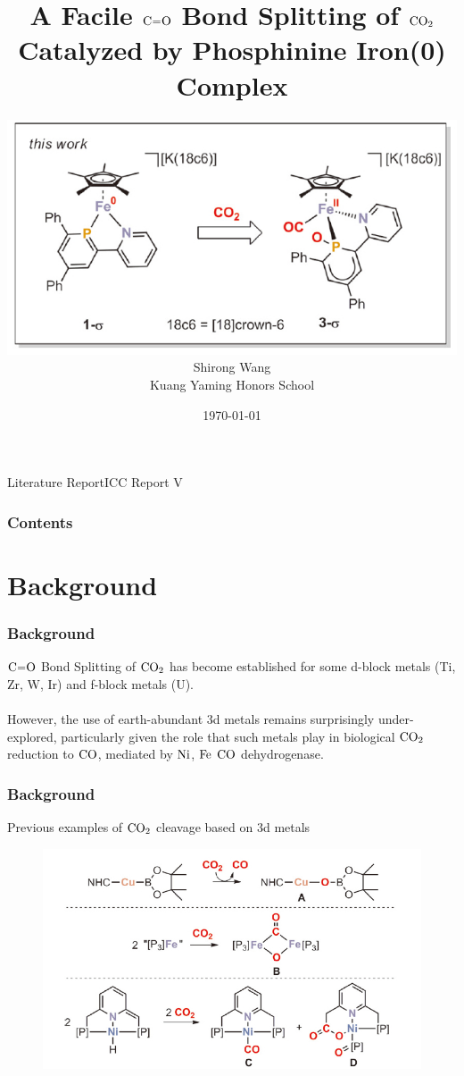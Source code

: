 \documentclass[10pt,aspectratio=43]{beamer}
\title{A Facile $ \ce{C=O} $ Bond Splitting of $ \ce{CO_2} $\\
	Catalyzed by Phosphinine Iron(0) Complex}	        %
\author[]{            %
	\includegraphics[width=0.55\linewidth]{reax.jpg}\\[0.3cm]
    {\large Shirong Wang}\\[0.3cm]
    Kuang Yaming Honors School\\
    [-0.8cm]}
\date{\today}
\numberwithin{equation}{section}
\begin{document}
\begin{frame}
Literature Report\hfill ICC Report V
\titlepage
\end{frame}

\begin{frame}
\frametitle{Contents}
\large\tableofcontents
\end{frame}

\section{Background}
%

\begin{frame}
\frametitle{Background}
$ \ce{C=O} $ Bond Splitting of $ \ce{CO_2} $ has become established
for %
some d-block metals (Ti, Zr, W, Ir) and f-block metals (U).\\
~\\
However, the use of
earth-abundant 3d metals remains surprisingly under-explored,
particularly given the role that such metals play in
biological $ \ce{CO_2} $ reduction to $ \ce{CO} $, mediated by $ \ce{Ni} $, $ \ce{Fe} $ $ \ce{CO} $ dehydrogenase.
\end{frame}

\begin{frame}
\frametitle{Background}
Previous examples of $ \ce{CO_2} $ cleavage based on 3d metals\\
\begin{figure}
	\includegraphics[width=0.7\linewidth]{lit.jpg}
\end{figure}
\hfill\footnotesize{}\\
\hfill\footnotesize{}\\
\hfill\footnotesize{}
\end{frame}
\end{document}
